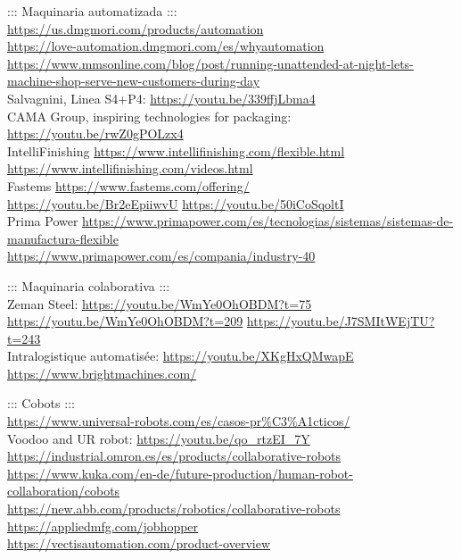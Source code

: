 \documentclass[spanish,12pt,a4paper,final,oneside]{book}
\begin{document}
::: Maquinaria automatizada :::
\\ \url{https://us.dmgmori.com/products/automation}
\\ \url{https://love-automation.dmgmori.com/es/whyautomation}
\\ {\footnotesize \url{https://www.mmsonline.com/blog/post/running-unattended-at-night-lets-machine-shop-serve-new-customers-during-day}}
\\Salvagnini, Linea S4+P4: \url{https://youtu.be/339ffjLbma4}
\\CAMA Group, inspiring technologies for packaging: \url{https://youtu.be/rwZ0gPOLzx4}
\\IntelliFinishing \url{https://www.intellifinishing.com/flexible.html}
\\ \url{https://www.intellifinishing.com/videos.html}
\\Fastems \url{https://www.fastems.com/offering/}
\\ \url{https://youtu.be/Br2eEpiiwvU} \hspace{0.3cm} \url{https://youtu.be/50iCoSqoltI}
\\ Prima Power \url{https://www.primapower.com/es/tecnologias/sistemas/sistemas-de-manufactura-flexible}
\\ \url{https://www.primapower.com/es/compania/industry-40}

::: Maquinaria colaborativa :::
\\Zeman Steel: \url{https://youtu.be/WmYe0OhOBDM?t=75} \hspace{0.3cm} \url{https://youtu.be/WmYe0OhOBDM?t=209} \hspace{0.3cm} \url{https://youtu.be/J7SMItWEjTU?t=243}
\\Intralogistique automatisée: \url{https://youtu.be/XKgHxQMwapE}
\\ \url{https://www.brightmachines.com/}

::: Cobots :::
\\ \url{https://www.universal-robots.com/es/casos-pr%C3%A1cticos/}
\\ Voodoo and UR robot: \url{https://youtu.be/qo_rtzEI_7Y}
\\ \url{https://industrial.omron.es/es/products/collaborative-robots}
\\ \url{https://www.kuka.com/en-de/future-production/human-robot-collaboration/cobots}
\\ \url{https://new.abb.com/products/robotics/collaborative-robots}
\\ \url{https://appliedmfg.com/jobhopper}
\\ \url{https://vectisautomation.com/product-overview}
\end{document}
